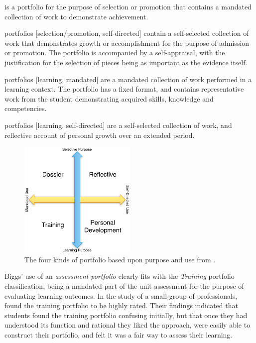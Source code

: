 \begin{description}
	\item[Dossier] [selection/promotion, mandated] is a portfolio for the purpose of selection or promotion that contains a mandated collection of work to demonstrate achievement. 
	\item[Reflective] portfolios [selection/promotion, self-directed] contain a self-selected collection of work that demonstrates growth or accomplishment for the purpose of admission or promotion. The portfolio is accompanied by a self-appraisal, with the justification for the selection of pieces being as important as the evidence itself.
	\item[Training] portfolios [learning, mandated] are a mandated collection of work performed in a learning context. The portfolio has a fixed format, and contains representative work from the student demonstrating acquired skills, knowledge and competencies.
	\item[Personal development] portfolios [learning, self-directed] are a self-selected collection of work, and reflective account of personal growth over an extended period.
\end{description}

\begin{figure}[htbp]
	\centering
	\includegraphics[width=0.50\textwidth]{PortfolioTypes}
	\caption{The four kinds of portfolio based upon purpose and use from \citet{Smith:2001}.}
	\label{fig:portfolio_types}
\end{figure}

Biggs' use of an \emph{assessment portfolio} clearly fits with the \emph{Training} portfolio classification, being a mandated part of the unit assessment for the purpose of evaluating learning outcomes. In the study of a small group of professionals, \citet{Smith:2001} found the training portfolio to be highly rated. Their findings indicated that students found the training portfolio confusing initially, but that once they had understood its function and rational they liked the approach, were easily able to construct their portfolio, and felt it was a fair way to assess their learning.

